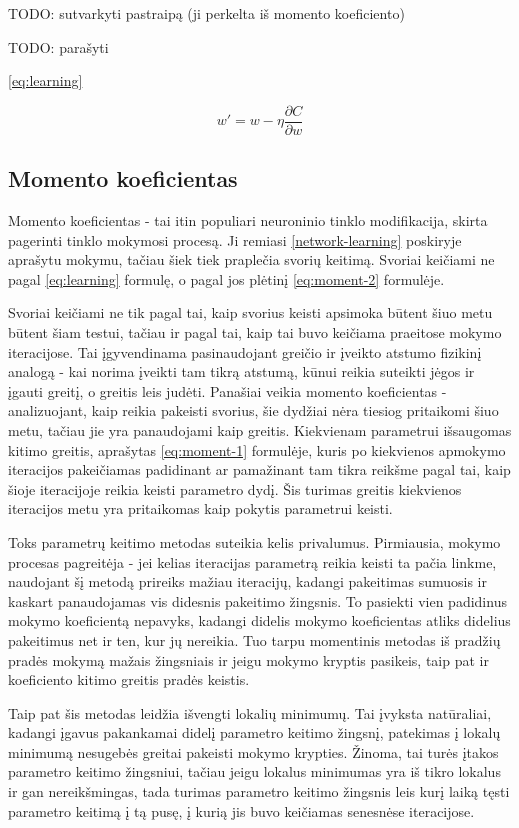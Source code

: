 \documentclass{VUMIFPSbakalaurinis}
\newcommand{\TODO}[1]{
\colorbox{todo-background-color}{TODO: #1}
}
\begin{document}
\TODO{sutvarkyti pastraipą (ji perkelta iš momento koeficiento)}

\TODO{parašyti}
\ref{eq:learning}

\begin{equation}\label{eq:learning}
w' = w - \eta\frac{\partial C}{\partial w}
\end{equation}


\subsection{Momento koeficientas}

Momento koeficientas - tai itin populiari neuroninio tinklo modifikacija, skirta pagerinti tinklo mokymosi procesą.
Ji remiasi \ref{network-learning} poskiryje aprašytu mokymu, tačiau šiek tiek praplečia svorių keitimą.
Svoriai keičiami ne pagal \ref{eq:learning} formulę, o pagal jos plėtinį \ref{eq:moment-2} formulėje.

Svoriai keičiami ne tik pagal tai, kaip svorius keisti apsimoka būtent šiuo metu būtent šiam testui, tačiau ir pagal tai, kaip tai buvo keičiama praeitose mokymo iteracijose.
Tai įgyvendinama pasinaudojant greičio ir įveikto atstumo fizikinį analogą - kai norima įveikti tam tikrą atstumą, kūnui reikia suteikti jėgos ir įgauti greitį, o greitis leis judėti.
Panašiai veikia momento koeficientas - analizuojant, kaip reikia pakeisti svorius, šie dydžiai nėra tiesiog pritaikomi šiuo metu, tačiau jie yra panaudojami kaip greitis.
Kiekvienam parametrui išsaugomas kitimo greitis, aprašytas \ref{eq:moment-1} formulėje, kuris po kiekvienos apmokymo iteracijos pakeičiamas padidinant ar pamažinant tam tikra reikšme pagal tai, kaip šioje iteracijoje reikia keisti parametro dydį.
Šis turimas greitis kiekvienos iteracijos metu yra pritaikomas kaip pokytis parametrui keisti.

Toks parametrų keitimo metodas suteikia kelis privalumus.
Pirmiausia, mokymo procesas pagreitėja - jei kelias iteracijas parametrą reikia keisti ta pačia linkme, naudojant šį metodą prireiks mažiau iteracijų, kadangi pakeitimas sumuosis ir kaskart panaudojamas vis didesnis pakeitimo žingsnis.
To pasiekti vien padidinus mokymo koeficientą nepavyks, kadangi didelis mokymo koeficientas atliks didelius pakeitimus net ir ten, kur jų nereikia.
Tuo tarpu momentinis metodas iš pradžių pradės mokymą mažais žingsniais ir jeigu mokymo kryptis pasikeis, taip pat ir koeficiento kitimo greitis pradės keistis.

Taip pat šis metodas leidžia išvengti lokalių minimumų.
Tai įvyksta natūraliai, kadangi įgavus pakankamai didelį parametro keitimo žingsnį, patekimas į lokalų minimumą nesugebės greitai pakeisti mokymo krypties.
Žinoma, tai turės įtakos parametro keitimo žingsniui, tačiau jeigu lokalus minimumas yra iš tikro lokalus ir gan nereikšmingas, tada turimas parametro keitimo žingsnis leis kurį laiką tęsti parametro keitimą į tą pusę, į kurią jis buvo keičiamas senesnėse iteracijose.
\end{document}

